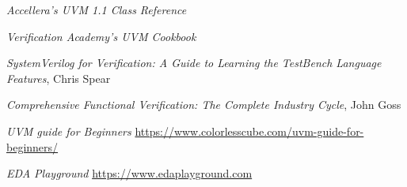 \documentclass[a4paper,11pt]{article}
\begin{document}
\begin{thebibliography}{i}
 {\em Accellera's UVM 1.1 Class Reference}

 {\em Verification Academy's UVM Cookbook}

 {\em SystemVerilog for Verification: A Guide to Learning the TestBench Language Features}, Chris Spear

 {\em Comprehensive Functional Verification: The Complete Industry Cycle}, John Goss

 {\em UVM guide for Beginners}
\url{https://www.colorlesscube.com/uvm-guide-for-beginners/}

 {\em EDA Playground}
\url{https://www.edaplayground.com}

\end{thebibliography} 
%
%
% 
 
\end{document}
